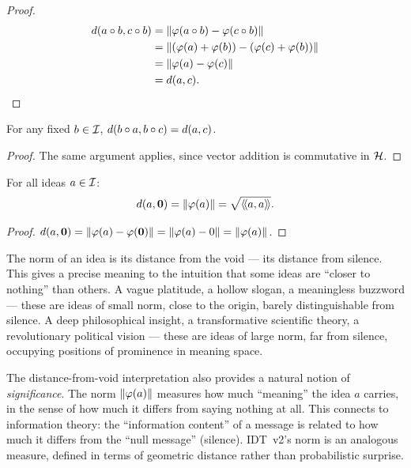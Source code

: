 \begin{proof}
\begin{align*}
  d(a \circ b, c \circ b)
  &= \lVert \varphi(a \circ b) - \varphi(c \circ b) \rVert \\
  &= \lVert (\varphi(a) + \varphi(b)) - (\varphi(c) + \varphi(b)) \rVert \\
  &= \lVert \varphi(a) - \varphi(c) \rVert \\
  &= d(a, c).
\end{align*}
\end{proof}

\begin{corollary}
\label{cor:left-isometry}
For any fixed $b \in \mathcal{I}$, $d(b \circ a, b \circ c) = d(a, c)$.
\end{corollary}

\begin{proof}
The same argument applies, since vector addition is commutative in $\mathcal{H}$.
\end{proof}

\begin{theorem}
\label{thm:distance-void}
For all ideas $a \in \mathcal{I}$:
\[
  d(a, \mathbf{0}) = \lVert \varphi(a) \rVert = \sqrt{\langle\!\langle a, a \rangle\!\rangle}.
\]
\end{theorem}

\begin{proof}
$d(a, \mathbf{0}) = \lVert \varphi(a) - \varphi(\mathbf{0}) \rVert = \lVert \varphi(a) - 0 \rVert =
\lVert \varphi(a) \rVert$.
\end{proof}

\begin{interpretation}
\label{interp:norm-distance}
The norm of an idea is its distance from the void --- its distance from silence.
This gives a precise meaning to the intuition that some ideas are ``closer to
nothing'' than others. A vague platitude, a hollow slogan, a meaningless
buzzword --- these are ideas of small norm, close to the origin, barely
distinguishable from silence. A deep philosophical insight, a transformative
scientific theory, a revolutionary political vision --- these are ideas of
large norm, far from silence, occupying positions of prominence in meaning
space.

The distance-from-void interpretation also provides a natural notion of
\emph{significance}. The norm $\lVert \varphi(a) \rVert$ measures how much ``meaning''
the idea $a$ carries, in the sense of how much it differs from saying nothing
at all. This connects to information theory: the ``information content'' of a
message is related to how much it differs from the ``null message'' (silence).
IDT~v2's norm is an analogous measure, defined in terms of geometric distance
rather than probabilistic surprise.
\end{interpretation}


